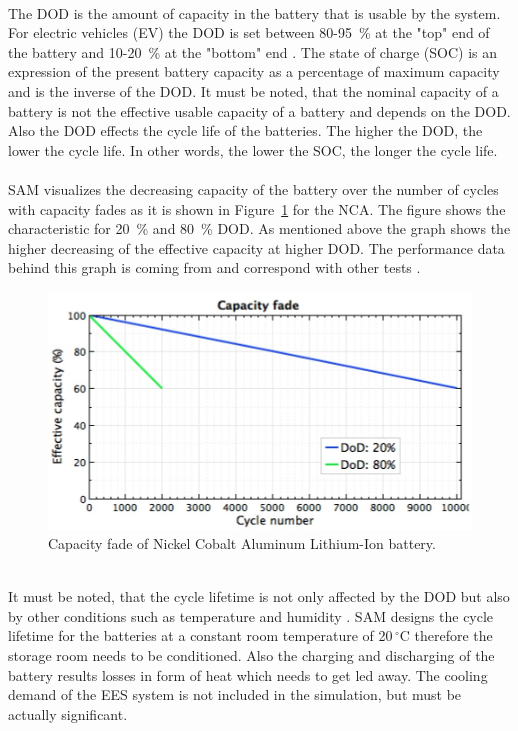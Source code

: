 \documentclass[Master,MEE,english]{twbook}%
\begin{document}
\\
The DOD is the amount of capacity in the battery that is usable by the system. For electric vehicles (EV) the DOD is set between 80-95~\% at the "top" end of the battery and 10-20~\% at the "bottom" end \cite{Warner2014}. The state of charge (SOC) is an expression of the present battery capacity as a percentage of maximum capacity and is the inverse of the DOD. It must be noted, that the nominal capacity of a battery is not the effective usable capacity of a battery and depends on the DOD. Also the DOD effects the cycle life of the batteries. The higher the DOD, the lower the cycle life. In other words, the lower the SOC, the longer the cycle life. \cite{MitElectricVehilceTeam2008}\\
\\
SAM visualizes the decreasing capacity of the battery over the number of cycles with capacity fades as it is shown in Figure~\ref{CapacityFade} for the NCA. The figure shows the characteristic for 20~\% and 80~\% DOD. As mentioned above the graph shows the higher decreasing of the effective capacity at higher DOD. The performance data behind this graph is coming from \cite{Dahn2011} and correspond with other tests \cite{Read2009}.
\begin{figure}[bhtp]  
\centering
\includegraphics[width=0.75\linewidth]{FIG/CapacityFade}
\caption[Capacity fade of Nickel Cobalt Aluminum Lithium-Ion battery.]{Capacity fade of Nickel Cobalt Aluminum Lithium-Ion battery.}\label{CapacityFade}
\end{figure}\\
It must be noted, that the cycle lifetime is not only affected by the DOD but also by other conditions such as temperature and humidity \cite{MitElectricVehilceTeam2008}. SAM designs the cycle lifetime for the batteries at a constant room temperature of 20$\,^{\circ}\mathrm{C}$ therefore the storage room needs to be conditioned. Also the charging and discharging of the battery results losses in form of heat which needs to get led away. The cooling demand of the EES system is not included in the simulation, but must be actually significant. \cite{Diorio2015} \\
\end{document}
